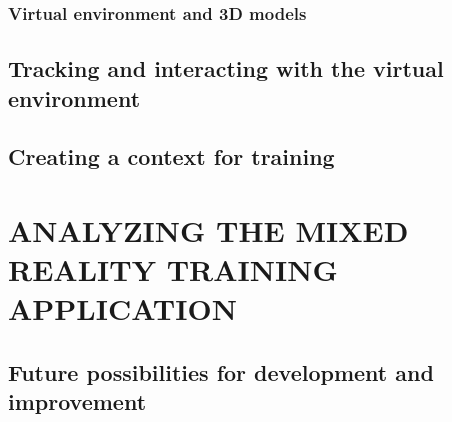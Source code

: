 \documentclass[12pt, a4paper,oneside, nocenter]{thesis}
\begin{document}
\subsection{Virtual environment and 3D models}
\section{Tracking and interacting with the virtual environment}
\section{Creating a context for training}

\par
\chapter{\MakeUppercase{Analyzing the mixed reality training application}}

\section{Future possibilities for development and improvement}


\newpage

\nocite{*}

\end{document}
